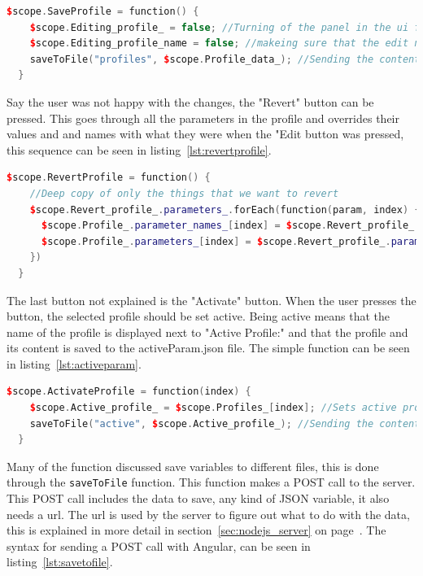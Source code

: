 \begin{lstlisting}[caption = {SaveProfile function in editParam.js}, captionpos=b, label={lst:saveprofile}, language=C++,firstnumber=1]
$scope.SaveProfile = function() {
    $scope.Editing_profile_ = false; //Turning of the panel in the ui for editing
    $scope.Editing_profile_name = false; //makeing sure that the edit name ui change is reset.
    saveToFile("profiles", $scope.Profile_data_); //Sending the content to the server to get saved.
  }
\end{lstlisting}

Say the user was not happy with the changes, the "Revert" button can be pressed. This goes through all the parameters in the profile and overrides their values and and names with what they were when the "Edit button was pressed, this sequence can be seen in listing~\ref{lst:revertprofile}.

\begin{lstlisting}[caption = {RevertProfile function in editParam.js}, captionpos=b, label={lst:revertprofile}, language=C++,firstnumber=1]
$scope.RevertProfile = function() {
    //Deep copy of only the things that we want to revert
    $scope.Revert_profile_.parameters_.forEach(function(param, index) {
      $scope.Profile_.parameter_names_[index] = $scope.Revert_profile_.parameter_names_[index];
      $scope.Profile_.parameters_[index] = $scope.Revert_profile_.parameters_[index];
    })
  }
\end{lstlisting}

The last button not explained is the "Activate" button. When the user presses the button, the selected profile should be set active. Being active means that the name of the profile is displayed next to "Active Profile:" and that the profile and its content is saved to the activeParam.json file. The simple function can be seen in listing~\ref{lst:activeparam}.

\begin{lstlisting}[caption = {ActivateProfile function in editParam.js}, captionpos=b, label={lst:activeparam}, language=C++,firstnumber=1]
$scope.ActivateProfile = function(index) {
    $scope.Active_profile_ = $scope.Profiles_[index]; //Sets active profile to be the profile at index in the list Profiles_
    saveToFile("active", $scope.Active_profile_); //Sending the content to the server to get saved.
  }
\end{lstlisting}

Many of the function discussed save variables to different files, this is done through the \texttt{saveToFile} function. This function makes a POST call to the server. This POST call includes the data to save, any kind of JSON variable, it also needs a url. The url is used by the server to figure out what to do with the data, this is explained in more detail in section~\ref{sec:nodejs_server}  on page~\pageref{sec:nodejs_server}. The syntax for sending a POST call with Angular, can be seen in listing~\ref{lst:savetofile}.


